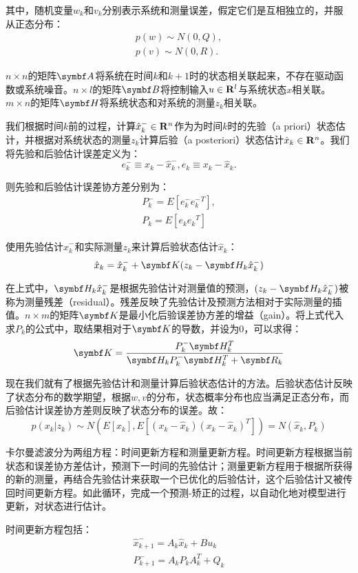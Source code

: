   其中，随机变量$w_k$和$v_k$分别表示系统和测量误差，假定它们是互相独立的，并服从正态分布：
\begin{gather*}
p(w)\sim N(0,Q),\\
p(v)\sim N(0,R).
\end{gather*}
  
  $n\times n$的矩阵$\mat{A}$将系统在时间$k$和$k+1$时的状态相关联起来，不存在驱动函数或系统噪音。$n\times l$的矩阵$\mat{B}$将控制输入$u\in \mathbf{R}^l$与系统状态$x$相关联。$m\times n$的矩阵$\mat{H}$将系统状态和对系统的测量$z_k$相关联。

  我们根据时间$k$前的过程，计算$\hat{x}^{-}_k \in \mathbf{R}^n$作为为时间$k$时的先验（a priori）状态估计，并根据对系统状态的测量$z_k$计算后验（a posteriori）状态估计$\hat{x}_k \in \mathbf{R}^n$。我们将先验和后验估计误差定义为：
$$e^{-}_k \equiv x_k -\hat{x}^{-}_k, e_k \equiv x_k - \hat{x}_k. $$

  则先验和后验估计误差协方差分别为：
\begin{gather*}
P^{-}_k = E[e^{-}_k {e^{-}_k}^T],\\
P_k=E[e_k {e_k}^T]
\end{gather*}

  使用先验估计$\hat{x}^{-}_k$和实际测量$z_k$来计算后验状态估计$\hat{x}_k$：
$$\hat{x}_k = \hat{x}^{-}_k + \mat{K} (z_k - \mat{H}_k \hat{x}^{-}_k)$$

  在上式中，$\mat{H}_k \hat{x}^{-}_k$是根据先验估计对测量值的预测，$(z_k - \mat{H}_k \hat{x}^{-}_k)$被称为测量残差（residual）。残差反映了先验估计及预测方法相对于实际测量的插值。$n\times m$的矩阵$\mat{K}$是最小化后验误差协方差的增益（gain）。将上式代入求$P_k$的公式中，取结果相对于$\mat{K}$的导数，并设为0，可以求得：
$$\mat{K}=\frac{P^{-}_k \mat{H}^T_k}{\mat{H}_k P^{-}_k \mat{H}^T_k + \mat{R}_k}$$
  
  现在我们就有了根据先验估计和测量计算后验状态估计的方法。后验状态估计反映了状态分布的数学期望，根据$w,v$的分布，状态概率分布也应当满足正态分布，而后验估计误差协方差则反映了状态分布的误差。故：
$$p(x_k|z_k)\sim N(E[x_k],E[(x_k-\hat{x}_k)(x_k-\hat{x}_k)^T])=N(\hat{x}_k,P_k)$$

  卡尔曼滤波分为两组方程：时间更新方程和测量更新方程。时间更新方程根据当前状态和误差协方差估计，预测下一时间的先验估计；测量更新方程用于根据所获得的新的测量，再结合先验估计来获取一个已优化的后验估计，这个后验估计又被传回时间更新方程。如此循环，完成一个预测-矫正的过程，以自动化地对模型进行更新，对状态进行估计。

  时间更新方程包括：
\begin{gather*}
\hat{x}^{-}_{k+1}=A_k \hat{x}_k + B u_k \\
P^{-}_{k+1}=A_k P_k A^T_k + Q_k
\end{gather*}

